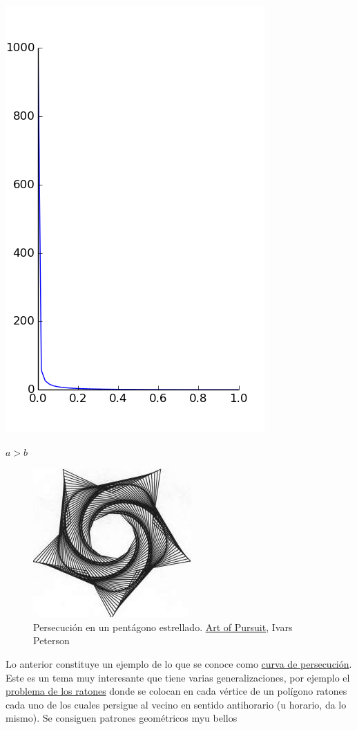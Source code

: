 \documentclass{article}
\newcounter{ejemplo_cont}
\begin{document}
\begin{center}
\includegraphics[scale=.3]{imagenes/perse_a_2_b_1.png}

$a>b$
\end{center}


\begin{figure}
\begin{center}
 \includegraphics[scale=.4]{imagenes/persecucion2.jpg}
 \caption{\small Persecución en un pentágono estrellado.
\href{https://www.sciencenews.org/article/art-pursuit-3}{Art of Pursuit},
Ivars Peterson
}
\end{center}
\end{figure}
Lo anterior constituye un ejemplo de lo que se conoce como \href{https://en.wikipedia.org/wiki/Pursuit_curve}{curva de persecución}. Este es un tema muy interesante que tiene varias generalizaciones, por ejemplo el \href{https://en.wikipedia.org/wiki/Mice_problem}{problema de los ratones} donde se colocan en cada vértice de un polígono ratones cada uno de los cuales persigue al vecino en sentido antihorario (u horario, da lo mismo). Se consiguen patrones geométricos myu bellos
\end{document}
